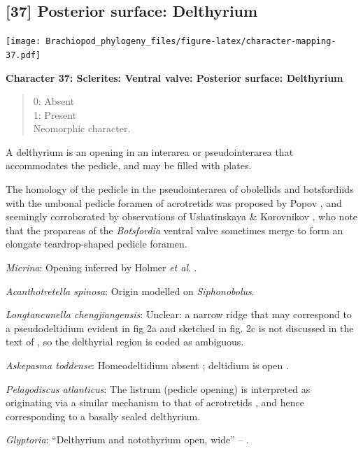 \documentclass[]{book}
\theoremstyle{definition}
\theoremstyle{definition}
\theoremstyle{definition}
\theoremstyle{remark}
\begin{document}
\hypertarget{posterior-surface-delthyrium}{%
\subsection*{{[}37{]} Posterior surface:
Delthyrium}\label{posterior-surface-delthyrium}}

\texttt{[image: Brachiopod\_phylogeny\_files/figure-latex/character-mapping-37.pdf]}

\textbf{Character 37: Sclerites: Ventral valve: Posterior surface:
Delthyrium}

\begin{quote}
0: Absent\\
1: Present\\
Neomorphic character.
\end{quote}

A delthyrium is an opening in an interarea or pseudointerarea that
accommodates the pedicle, and may be filled with plates.

The homology of the pedicle in the pseudointerarea of obolellids and
botsfordiids with the umbonal pedicle foramen of acrotretids was
proposed by Popov \citeyearpar{Popov1992TheCambrian}, and seemingly
corroborated by observations of Ushatinskaya \& Korovnikov
\citeyearpar{Ushatinskaya2016Revisionof}, who note that the propareas of
the \emph{Botsfordia} ventral valve sometimes merge to form an elongate
teardrop-shaped pedicle foramen.

\emph{Micrina}: Opening inferred by Holmer \emph{et al}.
\citeyearpar{Holmer2008TheEarly}.

\emph{Acanthotretella spinosa}: Origin modelled on \emph{Siphonobolus}.

\emph{Longtancunella chengjiangensis}: Unclear: a narrow ridge that may
correspond to a pseudodeltidium evident in fig 2a and sketched in fig.
2c is not discussed in the text of \citet{Zhang2011Theexceptionally}, so
the delthyrial region is coded as ambiguous.

\emph{Askepasma toddense}: Homeodeltidium absent
\citep[p.~153]{Williams2000BrachiopodaLinguliformea}; deltidium is open
\citep[see][fig. 4]{Topper2013Theoldest}.

\emph{Pelagodiscus atlanticus}: The listrum (pedicle opening) is
interpreted as originating via a similar mechanism to that of
acrotretids \citep{Popov1992TheCambrian}, and hence corresponding to a
basally sealed delthyrium.

\emph{Glyptoria}: ``Delthyrium and notothyrium open, wide'' --
\citet{Cooper1976LowerCambrian}.
\end{document}
